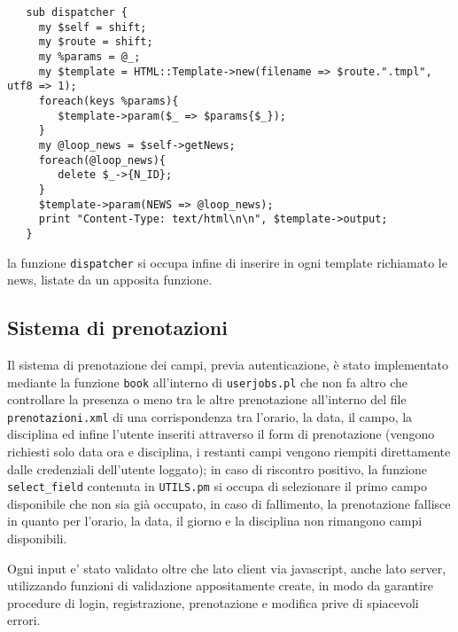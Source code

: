 \scriptsize{
\begin{verbatim}
   sub dispatcher {
     my $self = shift;
     my $route = shift;
     my %params = @_;
     my $template = HTML::Template->new(filename => $route.".tmpl", utf8 => 1);
     foreach(keys %params){
        $template->param($_ => $params{$_});
     }	
     my @loop_news = $self->getNews;
     foreach(@loop_news){
        delete $_->{N_ID};
     }
     $template->param(NEWS => @loop_news);
     print "Content-Type: text/html\n\n", $template->output;
   }
\end{verbatim}
}

\small{la funzione \texttt{dispatcher} si occupa infine di inserire in ogni template richiamato le news, listate da un apposita funzione.}

\subsection{Sistema di prenotazioni}
Il sistema di prenotazione dei campi, previa autenticazione, è stato implementato mediante la funzione \texttt{book} all'interno di \texttt{userjobs.pl} che non fa altro che controllare la presenza o meno tra le altre prenotazione all'interno del file \texttt{prenotazioni.xml} di una corrispondenza tra l'orario, la data, il campo, la disciplina ed infine l'utente inseriti attraverso il form di prenotazione (vengono richiesti solo data ora e disciplina, i restanti campi vengono riempiti direttamente dalle credenziali dell'utente loggato); in caso di riscontro positivo, la funzione \texttt{select\_field} contenuta in \texttt{UTILS.pm} si occupa di selezionare il primo campo disponibile che non sia già occupato, in caso di fallimento, la prenotazione fallisce in quanto per l'orario, la data, il giorno e la disciplina non rimangono campi disponibili.

Ogni input e' stato validato oltre che lato client via javascript, anche lato server, utilizzando funzioni di validazione appositamente create, in modo da garantire procedure di login, registrazione, prenotazione e modifica prive di spiacevoli errori.
